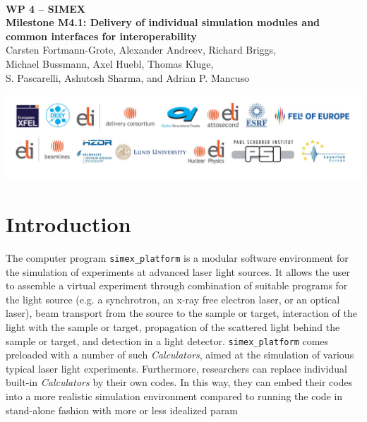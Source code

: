 \documentclass[12pt]{scrartcl}
\begin{document}
\makeatletter
\begin{titlepage}
\thispagestyle{scrheadings}
\begin{center}
$~$\\
\vspace{2cm}
\Huge{\textbf{WP 4 -- SIMEX\\[1cm]
Milestone M4.1: Delivery of individual simulation modules and common interfaces
for interoperability}}\\[5mm]
\vspace{2cm}
\large{
Carsten Fortmann-Grote, Alexander Andreev, Richard Briggs,\\ Michael Bussmann,
  Axel Huebl, Thomas Kluge,\\
 S. Pascarelli, Ashutosh Sharma, and Adrian P. Mancuso\\
 }
\vspace{1cm}
\@date
\end{center}
\vfill%
\includegraphics[width=\textwidth]{./PartnerLogos.pdf}
\normalfont
\end{titlepage}
\makeatother

%
\section{Introduction}
The computer program \texttt{simex\_platform} \cite{simex_github} is a modular
software environment for the simulation of experiments at advanced laser light
sources. It allows the user to assemble a virtual experiment through combination
of suitable programs for the light source (e.g. a synchrotron, an x-ray free
electron laser, or an optical laser), beam transport from the source to the
sample or target, interaction of the light with the sample or target,
propagation of the scattered light behind the sample or target, and detection in
a light detector. \texttt{simex\_platform} comes preloaded with a number of such
\textit{Calculators}, aimed at the simulation of various typical laser light
experiments. Furthermore, researchers can replace individual built-in
\textit{Calculators} by their own codes. In this way, they can embed their codes
into a more realistic simulation environment compared to running the code in
stand-alone fashion with more or less idealized param
\end{document}
